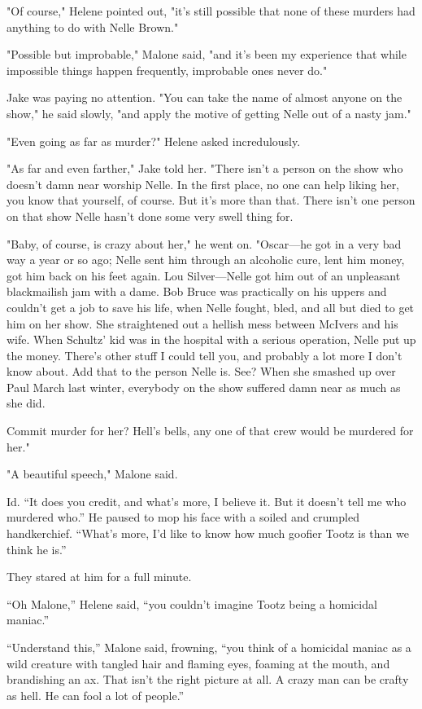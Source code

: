 \documentclass{novel}
\begin{document}
"Of course," Helene pointed out, "it's still possible that none of these murders had anything to do with Nelle Brown."

"Possible but improbable," Malone said, "and it's been my experience that while impossible things happen frequently, improbable ones never do."

Jake was paying no attention. "You can take the name of almost anyone on the show," he said slowly, "and apply the motive of getting Nelle out of a nasty jam."

"Even going as far as murder?" Helene asked incredulously.

"As far and even farther," Jake told her. "There isn't a person on the show who doesn't damn near worship Nelle. In the first place, no one can help liking her, you know that yourself, of course. But it's more than that. There isn't one person on that show Nelle hasn't done some very swell thing for.

"Baby, of course, is crazy about her," he went on. "Oscar—he got in a very bad way a year or so ago; Nelle sent him through an alcoholic cure, lent him money, got him back on his feet again. Lou Silver—Nelle got him out of an unpleasant blackmailish jam with a dame. Bob Bruce was practically on his uppers and couldn't get a job to save his life, when Nelle fought, bled, and all but died to get him on her show. She straightened out a hellish mess between McIvers and his wife. When Schultz' kid was in the hospital with a serious operation, Nelle put up the money. There's other stuff I could tell you, and probably a lot more I don't know about. Add that to the person Nelle is. See? When she smashed up over Paul March last winter, everybody on the show suffered damn near as much as she did.

Commit murder for her? Hell's bells, any one of that crew would be murdered for her."

"A beautiful speech," Malone said.

Id. “It does you credit, and what’s more, I believe it. But it doesn’t tell me who murdered who.” He paused to mop his face with a soiled and crumpled handkerchief. “What’s more, I’d like to know how much goofier Tootz is than we think he is.”

They stared at him for a full minute.

“Oh Malone,” Helene said, “you couldn’t imagine Tootz being a homicidal maniac.”

“Understand this,” Malone said, frowning, “you think of a homicidal maniac as a wild creature with tangled hair and flaming eyes, foaming at the mouth, and brandishing an ax. That isn’t the right picture at all. A crazy man can be crafty as hell. He can fool a lot of people.”
\end{document}
